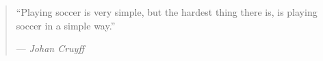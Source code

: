 %
\cleardoublepage
\thispagestyle{empty}

\begin{quote}
\noindent``Playing soccer is very simple, but the hardest thing there is, is playing soccer in a simple way.''
	
--- \emph{Johan Cruyff}
\end{quote}

\clearemptydoublepage